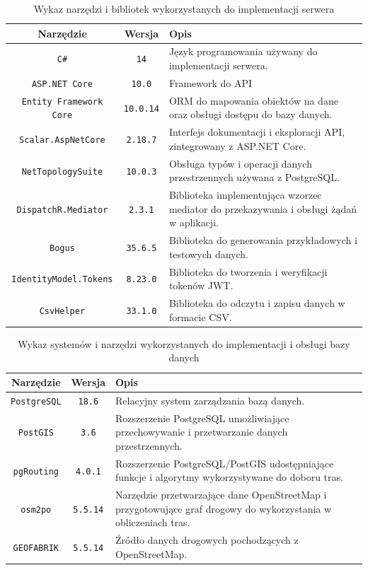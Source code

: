 \begin{table}[htb]
\small
\centering
\caption{Wykaz narzędzi i bibliotek wykorzystanych do implementacji serwera}
\label{tab:narzedzia-back}
\begin{tabularx}{\linewidth}{|c|c|X|} \hline
Narzędzie & Wersja & Opis \\ \hline\hline
\texttt{C\#} & \texttt{14} & Język programowania używany do implementacji serwera.  \\ \hline
\texttt{ASP.NET Core} & \texttt{10.0} & Framework do API  \\ \hline
\texttt{Entity Framework Core} & \texttt{10.0.14} & ORM do mapowania obiektów na dane oraz obsługi dostępu do bazy danych.  \\ \hline
\texttt{Scalar.AspNetCore} & \texttt{2.18.7} & Interfejs dokumentacji i eksploracji API, zintegrowany z ASP.NET Core.  \\ \hline
\texttt{NetTopologySuite} & \texttt{10.0.3} & Obsługa typów i operacji danych przestrzennych używana z PostgreSQL.  \\ \hline
\texttt{DispatchR.Mediator} & \texttt{2.3.1} & Biblioteka implementująca wzorzec mediator do przekazywania i obsługi żądań w aplikacji.  \\ \hline
\texttt{Bogus} & \texttt{35.6.5} & Biblioteka do generowania przykładowych i testowych danych.  \\ \hline
\texttt{IdentityModel.Tokens} & \texttt{8.23.0} & Biblioteka do tworzenia i weryfikacji tokenów JWT.  \\ \hline
\texttt{CsvHelper} & \texttt{33.1.0} & Biblioteka do odczytu i zapisu danych w formacie CSV.  \\ \hline
\end{tabularx}
\end{table}

\begin{table}[htb]
\small
\centering
\caption{Wykaz systemów i narzędzi wykorzystanych do implementacji i obsługi bazy danych}
\label{tab:narzedzia-db}
\begin{tabularx}{\linewidth}{|c|c|X|} \hline
Narzędzie & Wersja & Opis \\ \hline\hline
\texttt{PostgreSQL} & \texttt{18.6} & Relacyjny system zarządzania bazą danych.  \\ \hline
\texttt{PostGIS} & \texttt{3.6} & Rozszerzenie PostgreSQL umożliwiające przechowywanie i przetwarzanie danych przestrzennych.  \\ \hline
\texttt{pgRouting} & \texttt{4.0.1} & Rozszerzenie PostgreSQL/PostGIS udostępniające funkcje i algorytmy wykorzystywane do doboru tras.  \\ \hline
\texttt{osm2po} & \texttt{5.5.14} & Narzędzie przetwarzające dane OpenStreetMap i przygotowujące graf drogowy do wykorzystania w obliczeniach tras.  \\ \hline
\texttt{GEOFABRIK} & \texttt{5.5.14} & Źródło danych drogowych pochodzących z OpenStreetMap.  \\ \hline
\end{tabularx}
\end{table}

